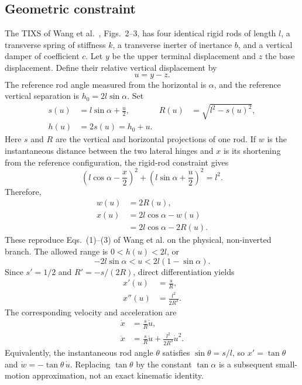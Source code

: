 \documentclass[a4paper,12pt]{article}
\numberwithin{equation}{section}
\begin{document}
\subsection{Geometric constraint}
The TIXS of Wang et al.~\cite{wang2024}, Figs.~2--3, has four identical rigid rods of length $l$, a transverse spring of stiffness $k$, a transverse inerter of inertance $b$, and a vertical damper of coefficient $c$. Let $y$ be the upper terminal displacement and $z$ the base displacement. Define their relative vertical displacement by
\begin{equation}
 u=y-z.
\end{equation}
The reference rod angle measured from the horizontal is $\alpha$, and the reference vertical separation is $h_0=2l\sin\alpha$. Set
\begin{equation}
\begin{aligned}
s(u)&=l\sin\alpha+\frac{u}{2},&
R(u)&=\sqrt{l^2-s(u)^2},\\
h(u)&=2s(u)=h_0+u.
\end{aligned}
\label{eq:geometry-defs}
\end{equation}
Here $s$ and $R$ are the vertical and horizontal projections of one rod. If $w$ is the instantaneous distance between the two lateral hinges and $x$ is its shortening from the reference configuration, the rigid-rod constraint gives
\begin{equation}
\left(l\cos\alpha-\frac{x}{2}\right)^2
+\left(l\sin\alpha+\frac{u}{2}\right)^2=l^2.
\label{eq:geometry}
\end{equation}
Therefore,
\begin{equation}
\begin{aligned}
w(u)&=2R(u),\\
x(u)&=2l\cos\alpha-w(u)\\
    &=2l\cos\alpha-2R(u).
\end{aligned}
\label{eq:lateral-x}
\end{equation}
These reproduce Eqs.~(1)--(3) of Wang et al. on the physical, non-inverted branch. The allowed range is $0<h(u)<2l$, or
\begin{equation}
 -2l\sin\alpha<u<2l(1-\sin\alpha).
 \label{eq:range}
\end{equation}
Since $s'=1/2$ and $R'=-s/(2R)$, direct differentiation yields
\begin{equation}
\begin{aligned}
x'(u)&=\frac{s}{R},\\
x''(u)&=\frac{l^2}{2R^3}.
\end{aligned}
\label{eq:x-derivs}
\end{equation}
The corresponding velocity and acceleration are
\begin{equation}
\begin{aligned}
\dot x&=\frac{s}{R}\dot u,\\
\ddot x&=\frac{s}{R}\ddot u+\frac{l^2}{2R^3}\dot u^2.
\end{aligned}
\label{eq:x-accel}
\end{equation}
Equivalently, the instantaneous rod angle $\theta$ satisfies $\sin\theta=s/l$, so $x'=\tan\theta$ and $\dot w=-\tan\theta\,\dot u$. Replacing $\tan\theta$ by the constant $\tan\alpha$ is a subsequent small-motion approximation, not an exact kinematic identity.
\end{document}
